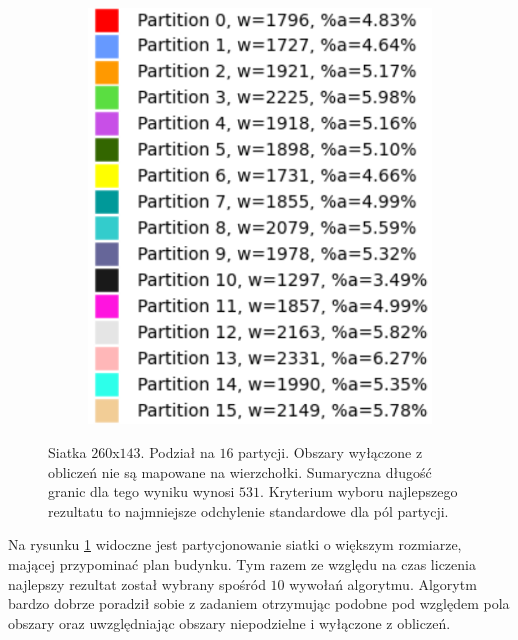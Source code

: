 \begin{figure}[h]
\centering
\begin{subfigure}{\textwidth}
    \centering
    \caption[short]{}
\end{subfigure}
\begin{subfigure}{\textwidth}
    \centering
    \caption[short]{}
\end{subfigure}
\begin{subfigure}{\textwidth}
    \centering
    \includegraphics[width=0.3\linewidth]{images/results/m_k/with/19/results}
    \caption[short]{}
\end{subfigure}
\caption{Siatka $260$x$143$. Podział na $16$ partycji.
Obszary wyłączone z obliczeń nie są mapowane na wierzchołki.
Sumaryczna długość granic dla tego wyniku wynosi $531$.
Kryterium wyboru najlepszego rezultatu to najmniejsze odchylenie standardowe dla pól partycji.}
\label{result:19}
\end{figure}
\FloatBarrier
Na rysunku \ref{result:19} widoczne jest partycjonowanie siatki o większym rozmiarze, mającej
przypominać plan budynku.
Tym razem ze względu na czas liczenia najlepszy rezultat został wybrany spośród $10$ wywołań algorytmu.
Algorytm bardzo dobrze poradził sobie z zadaniem otrzymując podobne pod względem pola obszary oraz uwzględniając
obszary niepodzielne i wyłączone z obliczeń.